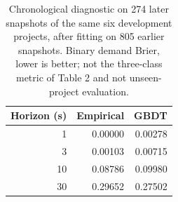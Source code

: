 \begin{table}[t]
\centering\small
\caption{Chronological diagnostic on 274 later snapshots of the same six development projects, after fitting on 805 earlier snapshots. Binary demand Brier, lower is better; not the three-class metric of Table 2 and not unseen-project evaluation.}
\label{tab:continuous-prediction}
\begin{tabular}{@{}rrr@{}}
\toprule
Horizon (s) & Empirical & GBDT \\
\midrule
1 & 0.00000 & 0.00278 \\
3 & 0.00103 & 0.00715 \\
10 & 0.08786 & 0.09980 \\
30 & 0.29652 & 0.27502 \\
\bottomrule
\end{tabular}
\end{table}
